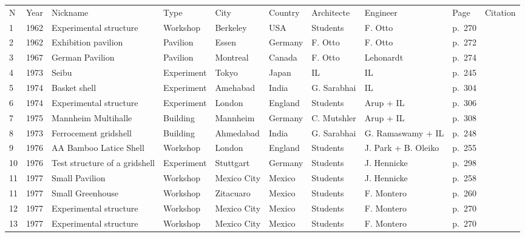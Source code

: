 \begin{landscape}%
\begin{table}[p]
\centering\small
{}
 	\begin{tabular}{@{}llll  lllllr@{}}
	\toprule
N & Year & Nickname & Type & City & Country & Architecte & Engineer & Page & Citation\\
1 & 1962 & Experimental structure  & Workshop & Berkeley & USA & Students & F. Otto & p.~270 & \cite{IL10}\\
2 & 1962 & Exhibition pavilion & Pavilion & Essen & Germany & F. Otto & F. Otto & p.~272 & \cite{IL10}\\
3 & 1967 & German Pavilion & Pavilion & Montreal & Canada & F. Otto & Lehonardt & p.~274 & \cite{IL10}\\
4 & 1973 & Seibu & Experiment & Tokyo & Japan & IL & IL & p.~245 & \cite{IL13}\\
5 & 1974 & Basket shell & Experiment & Amehabad & India & G. Sarabhai & IL & p.~304 & \cite{IL10}\\
6 & 1974 & Experimental structure  & Experiment & London & England & Students & Arup + IL & p.~306 & \cite{IL10}\\
7 & 1975 & Mannheim Multihalle & Building & Mannheim & Germany & C. Mutshler & Arup + IL & p.~308 & \cite{IL10}\\
8 & 1973 & Ferrocement gridshell & Building & Ahmedabad & India & G. Sarabhai & G. Ramaswamy + IL & p.~248 & \cite{IL13}\\
9 & 1976 & AA Bamboo Latice Shell & Workshop & London & England & Students & J. Park + B. Oleiko & p.~255 & \cite{IL13}\\
10 & 1976 & Test structure of a gridshell & Experiment & Stuttgart & Germany & Students & J. Hennicke & p.~298 & \cite{IL10}\\
11 & 1977 & Small Pavilion & Workshop & Mexico City & Mexico & Students & J. Hennicke & p.~258 & \cite{IL13}\\
11 & 1977 & Small Greenhouse & Workshop & Zitacuaro & Mexico & Students & F. Montero & p.~260 & \cite{IL13}\\
12 & 1977 & Experimental structure & Workshop & Mexico City & Mexico & Students & F. Montero & p.~270 & \cite{IL13}\\
13 & 1977 & Experimental structure & Workshop & Mexico City & Mexico & Students & F. Montero & p.~270 & \cite{IL13}\\

\end{tabular}
\end{table}
\end{landscape}
